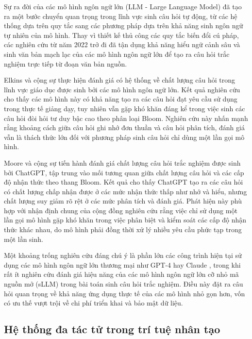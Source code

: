 Sự ra đời của các mô hình ngôn ngữ lớn (LLM - Large Language Model) đã tạo ra một bước chuyển quan trọng trong lĩnh vực sinh câu hỏi tự động, từ các hệ thống dựa trên quy tắc sang các phương pháp dựa trên khả năng sinh ngôn ngữ tự nhiên của mô hình. Thay vì thiết kế thủ công các quy tắc biến đổi cú pháp, các nghiên cứu từ năm 2022 trở đi đã tận dụng khả năng hiểu ngữ cảnh sâu và sinh văn bản mạch lạc của các mô hình ngôn ngữ lớn để tạo ra câu hỏi trắc nghiệm trực tiếp từ đoạn văn bản nguồn.

Elkins và cộng sự \cite{elkins2024useful} thực hiện đánh giá có hệ thống về chất lượng câu hỏi trong lĩnh vực giáo dục được sinh bởi các mô hình ngôn ngữ lớn. Kết quả nghiên cứu cho thấy các mô hình này có khả năng tạo ra các câu hỏi đạt yêu cầu sử dụng trong thực tế giảng dạy, tuy nhiên vẫn gặp khó khăn đáng kể trong việc sinh các câu hỏi đòi hỏi tư duy bậc cao theo phân loại Bloom. Nghiên cứu này nhấn mạnh rằng khoảng cách giữa câu hỏi ghi nhớ đơn thuần và câu hỏi phân tích, đánh giá vẫn là thách thức lớn đối với phương pháp sinh câu hỏi chỉ dùng một lần gọi mô hình.

Moore và cộng sự \cite{moore2023assessing} tiến hành đánh giá chất lượng câu hỏi trắc nghiệm được sinh bởi ChatGPT, tập trung vào mối tương quan giữa chất lượng câu hỏi và các cấp độ nhận thức theo thang Bloom. Kết quả cho thấy ChatGPT tạo ra các câu hỏi có chất lượng chấp nhận được ở các mức nhận thức thấp như nhớ và hiểu, nhưng chất lượng suy giảm rõ rệt ở các mức phân tích và đánh giá. Phát hiện này phù hợp với nhận định chung của cộng đồng nghiên cứu rằng việc chỉ sử dụng một lần gọi mô hình gặp khó khăn trong việc phân biệt và kiểm soát các cấp độ nhận thức khác nhau, do mô hình phải đồng thời xử lý nhiều yêu cầu phức tạp trong một lần sinh.

Một khoảng trống nghiên cứu đáng chú ý là phần lớn các công trình hiện tại sử dụng các mô hình ngôn ngữ lớn thương mại như GPT-4 \cite{gpt5_2025} hay Claude \cite{claude2025}, trong khi rất ít nghiên cứu đánh giá hiệu năng của các mô hình ngôn ngữ lớn cỡ nhỏ mã nguồn mở (sLLM) trong bài toán sinh câu hỏi trắc nghiệm. Điều này đặt ra câu hỏi quan trọng về khả năng ứng dụng thực tế của các mô hình nhỏ gọn hơn, vốn có ưu thế vượt trội về chi phí triển khai và bảo mật dữ liệu.

\subsection{Hệ thống đa tác tử trong trí tuệ nhân tạo}

